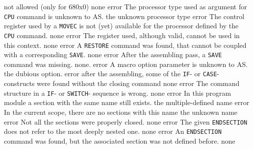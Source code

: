 \documentclass[12pt,twoside]{report}
\newcommand{\tty}[1]{{\tt #1}}
\begin{document}
\begin{description}
{                not allowed (only for 680x0)}
               {none}
               {error}
               {The processor type used as argument for \tty{CPU} command is
                unknown to AS.}
               {the unknown processor type}
               {error}
               {The control register used by a \tty{MOVEC} is not (yet) available
                for the processor defined by the \tty{CPU} command.}
               {none}
               {error}
               {The register used, although valid, cannot be used in this
                context.}
               {none}
               {error}
               {A \tty{RESTORE} command was found, that cannot be coupled with a
                corresponding \tty{SAVE}.}
               {none}
               {error}
               {After the assembling pass, a \tty{SAVE} command was missing.}
               {none.}
               {error}
               {A macro option parameter is unknown to AS.}
               {the dubious option.}
               {error}
               {after the assembling, some of the \tty{IF}- or \tty{CASE}- constructs
                were found without the closing command}
               {none}
               {error}
               {The command structure in a \tty{IF}- or \tty{SWITCH}- sequence is
                wrong.}
               {none}
               {error}
               {In this program module a section with the same name still
                exists.}
               {the multiple-defined name}
               {error}
               {In the current scope, there are no sections with this name}
               {the unknown name}
               {error}
               {Not all the sections were properly closed.}
               {none}
               {error}
               {The given \tty{ENDSECTION} does not refer to the most
                deeply nested one.}
               {none}
               {error}
               {An \tty{ENDSECTION} command was found, but the associated section
                was not defined before.}
               {none}

\end{description}
\end{document}

